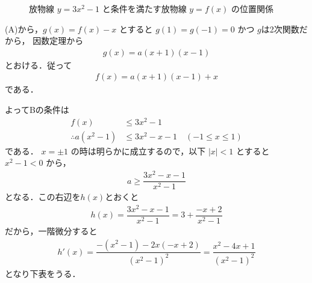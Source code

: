 \documentclass[../../main.tex]{subfiles}
\begin{document}
\begin{figure}[htb]
  \caption{放物線 $y = 3x^2 - 1$ と条件を満たす放物線 $y = f(x)$ の位置関係}
  \label{fig:fx_quadratic_envelope}
\end{figure}

(A)から，$g(x)=f(x)-x$ とすると $g(1)=g(-1)=0$ かつ $g$は2次関数だから，
因数定理から
\begin{align}
  g(x) = a(x+1)(x-1)
\end{align}
とおける．従って
\begin{align}
  f(x) = a(x+1)(x-1)+x \label{eq:1}
\end{align}
である．

よってBの条件は
\begin{align}
  f(x) &\le 3x^2-1 \\
  \therefore
  a(x^2-1) &\le 3x^2-x-1 \quad (-1 \le x \le 1) \label{eq:2}
\end{align}
である．
$x=\pm 1$ の時は明らかに成立するので，以下 $|x| < 1$ とすると $x^2-1 < 0$ から，
\begin{align}
  a \ge \dfrac{3x^2-x-1}{x^2-1} \label{eq:3}
\end{align}
となる．この右辺を$h(x)$とおくと
\begin{align}
  h(x) = \dfrac{3x^2-x-1}{x^2-1} = 3 + \dfrac{-x+2}{x^2-1} \label{eq:4}
\end{align}
だから，一階微分すると
\begin{align}
  h'(x) = \dfrac{-(x^2-1) - 2x(-x+2)}{(x^2-1)^2} = \dfrac{x^2-4x+1}{(x^2-1)^2}
\end{align}
となり下表をうる．
\end{document}
